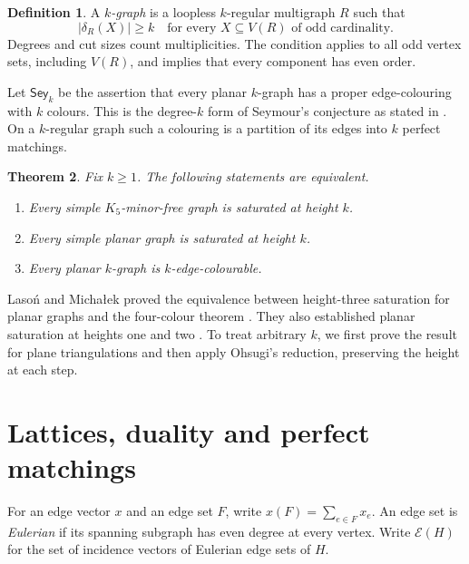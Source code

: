 \documentclass[10pt]{article}
\newtheorem{theorem}{Theorem}[section]
\theoremstyle{definition}
\newtheorem{definition}[theorem]{Definition}
\theoremstyle{remark}
\newcommand{\EC}{\mathcal E}
\begin{document}
\begin{definition}
A \emph{$k$-graph} is a loopless $k$-regular multigraph $R$ such that
\begin{equation}\label{eq:oddcut}
 |\delta_R(X)|\geq k\quad\text{for every }X\subseteq V(R)\text{ of odd cardinality}.
\end{equation}
Degrees and cut sizes count multiplicities.
The condition applies to all odd vertex sets, including $V(R)$, and implies that every component has even order.
\end{definition}

Let $\mathsf{Sey}_k$ be the assertion that every planar $k$-graph has a proper edge-colouring with $k$ colours.
This is the degree-$k$ form of Seymour's conjecture as stated in \cite[Conjecture~1.1]{CES}.
On a $k$-regular graph such a colouring is a partition of its edges into $k$ perfect matchings.

\begin{theorem}\label{thm:main}
Fix $k\geq1$.
The following statements are equivalent.
\begin{enumerate}[label=\textup{(\roman*)}]
\item Every simple $K_5$-minor-free graph is saturated at height $k$.
\item Every simple planar graph is saturated at height $k$.
\item Every planar $k$-graph is $k$-edge-colourable.
\end{enumerate}
\end{theorem}

Laso\'n and Micha\l{}ek proved the equivalence between height-three saturation for planar graphs and the four-colour theorem \cite[Theorem~4]{LM}.
They also established planar saturation at heights one and two \cite[Corollary~5]{LM}.
To treat arbitrary $k$, we first prove the result for plane triangulations and then apply Ohsugi's reduction, preserving the height at each step.

\section{Lattices, duality and perfect matchings}\label{sec:prelim}
For an edge vector $x$ and an edge set $F$, write $x(F)=\sum_{e\in F}x_e$.
An edge set is \emph{Eulerian} if its spanning subgraph has even degree at every vertex.
Write $\EC(H)$ for the set of incidence vectors of Eulerian edge sets of $H$.
\end{document}
